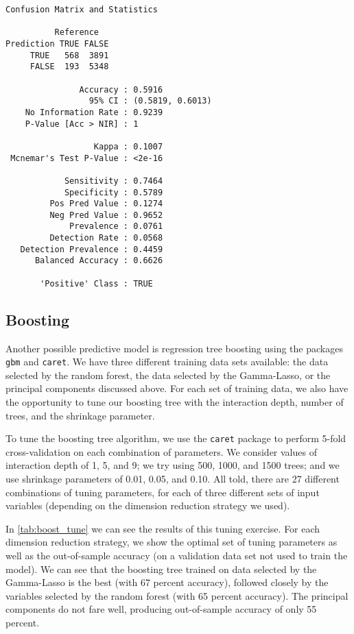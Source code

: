\documentclass[11pt, fleqn]{article}
\begin{document}
\begin{verbatim}
Confusion Matrix and Statistics

          Reference
Prediction TRUE FALSE
     TRUE   568  3891
     FALSE  193  5348
                                          
               Accuracy : 0.5916          
                 95% CI : (0.5819, 0.6013)
    No Information Rate : 0.9239          
    P-Value [Acc > NIR] : 1               
                                          
                  Kappa : 0.1007          
 Mcnemar's Test P-Value : <2e-16          
                                          
            Sensitivity : 0.7464          
            Specificity : 0.5789          
         Pos Pred Value : 0.1274          
         Neg Pred Value : 0.9652          
             Prevalence : 0.0761          
         Detection Rate : 0.0568          
   Detection Prevalence : 0.4459          
      Balanced Accuracy : 0.6626          
                                          
       'Positive' Class : TRUE
\end{verbatim}

\subsection{Boosting}
Another possible predictive model is regression tree boosting using the packages \texttt{gbm} and \texttt{caret}. We have three different training data sets available: the data selected by the random forest, the data selected by the Gamma-Lasso, or the principal components discussed above. For each set of training data, we also have the opportunity to tune our boosting tree with the interaction depth, number of trees, and the shrinkage parameter.

To tune the boosting tree algorithm, we use the \texttt{caret} package to perform 5-fold cross-validation on each combination of parameters. We consider values of interaction depth of 1, 5, and 9; we try using 500, 1000, and 1500 trees; and we use shrinkage parameters of 0.01, 0.05, and 0.10. All told, there are 27 different combinations of tuning parameters, for each of three different sets of input variables (depending on the dimension reduction strategy we used). 

In \cref{tab:boost_tune} we can see the results of this tuning exercise. For each dimension reduction strategy, we show the optimal set of tuning parameters as well as the out-of-sample accuracy (on a validation data set not used to train the model). We can see that the boosting tree trained on data selected by the Gamma-Lasso is the best (with 67 percent accuracy), followed closely by the variables selected by the random forest (with 65 percent accuracy). The principal components do not fare well, producing out-of-sample accuracy of only 55 percent.
\end{document}
